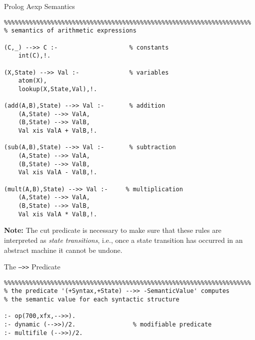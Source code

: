 \documentclass{beamer}
\begin{document}
\begin{frame}[fragile]{Prolog Aexp Semantics}
\tiny
\begin{verbatim}
%%%%%%%%%%%%%%%%%%%%%%%%%%%%%%%%%%%%%%%%%%%%%%%%%%%%%%%%%%%%%%%%%%%%%
% semantics of arithmetic expressions

(C,_) -->> C :-                    % constants
    int(C),!.

(X,State) -->> Val :-              % variables
    atom(X),
    lookup(X,State,Val),!.

(add(A,B),State) -->> Val :-       % addition
    (A,State) -->> ValA,
    (B,State) -->> ValB,
    Val xis ValA + ValB,!.

(sub(A,B),State) -->> Val :-       % subtraction
    (A,State) -->> ValA,
    (B,State) -->> ValB,
    Val xis ValA - ValB,!.

(mult(A,B),State) -->> Val :-     % multiplication
    (A,State) -->> ValA,
    (B,State) -->> ValB,
    Val xis ValA * ValB,!.
\end{verbatim}

\vspace{.1in}

{\bf Note:} The cut predicate is necessary to make sure that these
rules are interpreted as {\em state transitions}, i.e., once a state
transition has occurred in an abstract machine it cannot be undone.
\end{frame}


\begin{frame}[fragile]{The {\tt -->>} Predicate}

\tiny
\begin{verbatim}
%%%%%%%%%%%%%%%%%%%%%%%%%%%%%%%%%%%%%%%%%%%%%%%%%%%%%%%%%%%%%%%%%%%%%
% the predicate '(+Syntax,+State) -->> -SemanticValue' computes
% the semantic value for each syntactic structure

:- op(700,xfx,-->>).
:- dynamic (-->>)/2.                % modifiable predicate
:- multifile (-->>)/2.
\end{verbatim}

\end{frame}
\end{document}
